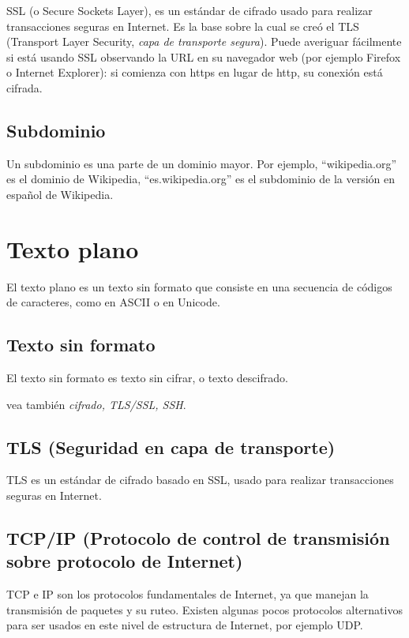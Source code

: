 SSL (o Secure Sockets Layer), es un estándar de cifrado usado para
realizar transacciones seguras en Internet. Es la base sobre la cual se
creó el TLS (Transport Layer Security, \emph{capa de transporte
segura}). Puede averiguar fácilmente si está usando SSL observando la
URL en su navegador web (por ejemplo Firefox o Internet Explorer): si
comienza con https en lugar de http, su conexión está cifrada.

\subsection{Subdominio}\label{subdominio}

Un subdominio es una parte de un dominio mayor. Por ejemplo,
``wikipedia.org'' es el dominio de Wikipedia, ``es.wikipedia.org'' es el
subdominio de la versión en español de Wikipedia.

\section{Texto plano}\label{texto-plano}

El texto plano es un texto sin formato que consiste en una secuencia de
códigos de caracteres, como en ASCII o en Unicode.

\subsection{Texto sin formato}\label{texto-sin-formato}

El texto sin formato es texto sin cifrar, o texto descifrado.

vea también \emph{cifrado, TLS/SSL, SSH}.

\subsection{TLS (Seguridad en capa de
transporte)}\label{tls-seguridad-en-capa-de-transporte}

TLS es un estándar de cifrado basado en SSL, usado para realizar
transacciones seguras en Internet.

\subsection{TCP/IP (Protocolo de control de transmisión sobre protocolo
de
Internet)}\label{tcpip-protocolo-de-control-de-transmisiuxf3n-sobre-protocolo-de-internet}

TCP e IP son los protocolos fundamentales de Internet, ya que manejan la
transmisión de paquetes y su ruteo. Existen algunas pocos protocolos
alternativos para ser usados en este nivel de estructura de Internet,
por ejemplo UDP.

